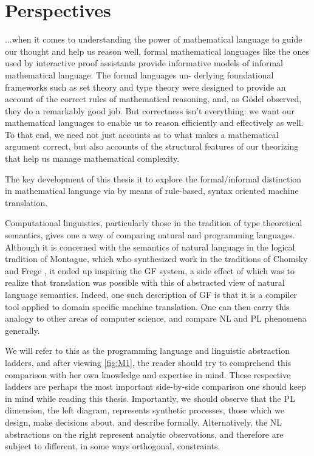 \section{Perspectives}

\begin{displayquote}

...when it comes to understanding the power of mathematical language to guide our
thought and help us reason well, formal mathematical languages like the ones
used by interactive proof assistants provide informative models of informal
mathematical language. The formal languages un- derlying foundational frameworks
such as set theory and type theory were designed to provide an account of the
correct rules of mathematical reasoning, and, as Gödel observed, they do a
remarkably good job. But correctness isn’t everything: we want our mathematical
languages to enable us to reason efficiently and effectively as well. To that
end, we need not just accounts as to what makes a mathematical argument correct,
but also accounts of the structural features of our theorizing that help us
manage mathematical complexity.\cite{avigad2015mathematics}

\end{displayquote}

The key development of this thesis it to explore the formal/informal distinction
in mathematical language via by means of rule-based, syntax oriented machine
translation.

Computational linguistics, particularly those in the tradition of type
theoretical semantics\cite{ranta1994type}, gives one a way of comparing natural
and programming languages. Although it is concerned with the semantics of
natural language in the logical tradition of Montague, which who synthesized
work in the traditions of Chomsky \cite{Chomsky57} and Frege \cite{frege79}, it
ended up inspiring the GF system, a side effect of which was to realize that
translation was possible with this of abstracted view of natural language
semantics. Indeed, one such description of GF is that it is a compiler tool
applied to domain specific machine translation. One can then carry this analogy
to other areas of computer science, and compare NL and PL phenomena generally.

We will refer to this as the programming language and linguistic abstraction
ladders, and after viewing \autoref{fig:M1}, the reader should try to comprehend
this comparison with her own knowledge and expertise in mind. These respective
ladders are perhaps the most important side-by-side comparison one should keep
in mind while reading this thesis. Importantly, we should observe that the PL
dimension, the left diagram, represents synthetic processes, those which we
design, make decisions about, and describe formally. Alternatively, the NL
abstractions on the right represent analytic observations, and therefore are
subject to different, in some ways orthogonal, constraints.

